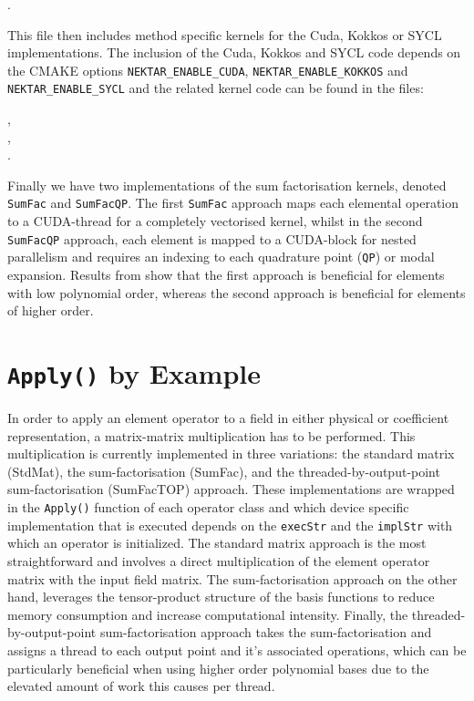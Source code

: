 .

This file then includes method specific kernels for the Cuda, Kokkos
or SYCL implementations. The inclusion of the Cuda, Kokkos and SYCL
code depends on the CMAKE options \texttt{NEKTAR\_ENABLE\_CUDA},
\texttt{NEKTAR\_ENABLE\_KOKKOS} and \texttt{NEKTAR\_ENABLE\_SYCL} and
the related kernel code can be found in the files:

,\\
,\\
.

Finally we have two implementations of the sum factorisation kernels,
denoted \texttt{SumFac} and \texttt{SumFacQP}. The first
\texttt{SumFac} approach maps each elemental operation to a CUDA-thread
for a completely vectorised kernel, whilst in the second
\texttt{SumFacQP} approach, each element is mapped to a CUDA-block for
nested parallelism and requires an indexing to each quadrature point
(\texttt{QP}) or modal expansion. Results from \cite{GPU_Vector} show
that the first approach is beneficial for elements with low polynomial
order, whereas the second approach is beneficial for elements of
higher order.


\section{\texttt{Apply()} by Example}

In order to apply an element operator to a field in either physical or coefficient representation, a matrix-matrix multiplication has to be performed. 
This multiplication is currently implemented in three variations: the standard matrix (StdMat), the sum-factorisation (SumFac), and the threaded-by-output-point sum-factorisation (SumFacTOP) approach.
These implementations are wrapped in the \texttt{Apply()} function of each operator class and which device specific implementation that is executed depends on the \texttt{execStr} and the \texttt{implStr} with which an operator is initialized.
The standard matrix approach is the most straightforward and involves a direct multiplication of the element operator matrix with the input field matrix.
The sum-factorisation approach on the other hand, leverages the tensor-product structure of the basis functions to reduce memory consumption and increase computational intensity.
Finally, the threaded-by-output-point sum-factorisation approach takes the sum-factorisation and assigns a thread to each output point and it's associated operations, which can be particularly
beneficial when using higher order polynomial bases due to the elevated amount of work this causes per thread.

